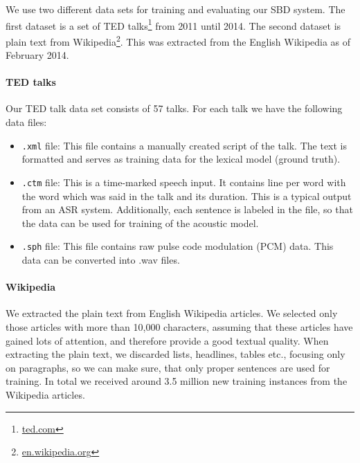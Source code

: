 We use two different data sets for training and evaluating our SBD system.
The first dataset is a set of TED talks\footnote{\url{ted.com}} from 2011 until 2014.
The second dataset is plain text from Wikipedia\footnote{\url{en.wikipedia.org}}.
This was extracted from the English Wikipedia as of February 2014.

\paragraph{TED talks}
Our TED talk data set consists of 57 talks. For each talk we have the following data files:
\begin{itemize}
	\item \texttt{.xml} file: This file contains a manually created script of the talk.
	The text is formatted and serves as training data for the lexical model (ground truth).
	\item \texttt{.ctm} file: This is a time-marked speech input.
	It contains line per word with the word which was said in the talk and its duration.
    This is a typical output from an ASR system.
	Additionally, each sentence is labeled in the file, so that the data can be used for training of the acoustic model.
	\item \texttt{.sph} file: This file contains raw pulse code modulation (PCM) data.
	This data can be converted into .wav files.
\end{itemize}

\paragraph{Wikipedia}
We extracted the plain text from English Wikipedia articles.
We selected only those articles with more than 10,000 characters, assuming that these articles have gained lots of attention, and therefore provide a good textual quality.
When extracting the plain text, we discarded lists, headlines, tables etc., focusing only on paragraphs, so we can make sure, that only proper sentences are used for training.
In total we received around 3.5 million new training instances from the Wikipedia articles.